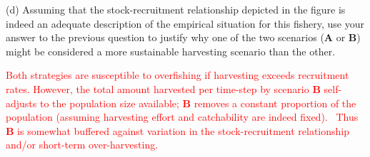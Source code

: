 \documentclass{article}
\begin{document}
(d) Assuming that the stock-recruitment relationship depicted in the figure is indeed an adequate description of the empirical situation for this fishery, use your answer to the previous question to justify why one of the two scenarios (\textbf{A} or \textbf{B}) might be considered a more sustainable harvesting scenario than the other. 

\textcolor{red}{Both strategies are susceptible to overfishing if harvesting exceeds recruitment rates.
However, the total amount harvested per time-step by scenario \textbf{B} self-adjusts to the population size available; \textbf{B} removes a constant proportion of the population (assuming harvesting effort and catchability are indeed fixed).  Thus \textbf{B} is somewhat buffered against variation in the stock-recruitment relationship and/or short-term over-harvesting.}
\end{document}
